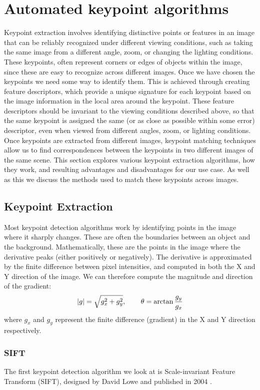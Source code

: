 \section{Automated keypoint algorithms}
\label{sec:keypoint-algos}
Keypoint extraction involves identifying distinctive points or features in an image that can be reliably recognized under different viewing conditions, such as taking the same image from a different angle, zoom, or changing the lighting conditions. These keypoints, often represent corners or edges of objects within the image, since these are easy to recognize across different images.
Once we have chosen the keypoints we need some way to identify them. This is achieved through creating feature descriptors, which provide a unique signature for each keypoint based on the image information in the local area around the keypoint. These feature descriptors should be invariant to the viewing conditions described above, so that the same keypoint is assigned the same (or as close as possible within some error) descriptor, even when viewed from different angles, zoom, or lighting conditions.
Once keypoints are extracted from different images, keypoint matching techniques allow us to find correspondences between the keypoints in two different images of the same scene. This section explores various keypoint extraction algorithms, how they work, and resulting advantages and disadvantages for our use case. As well as this we discuss the methods used to match these keypoints across images.\\

\subsection{Keypoint Extraction}
Most keypoint detection algorithms work by identifying points in the image where it sharply changes. These are often the boundaries between an object and the background. Mathematically, these are the points in the image where the derivative peaks (either positively or negatively). The derivative is approximated by the finite difference between pixel intensities, and computed in both the X and Y direction of the image. We can therefore compute the magnitude and direction of the gradient:
$$|g| = \sqrt{g^2_x + g^2_y}, \operatorname{\operatorname{\: \: \: \:} \operatorname{\: \: \: \:}} \theta = \arctan{\frac{g_y}{g_x}}$$
where $g_x$ and $g_y$ represent the finite difference (gradient) in the X and Y direction respectively. 

\subsubsection{SIFT}
The first keypoint detection algorithm we look at is Scale-invariant Feature Transform (SIFT), designed by David Lowe and published in 2004 \cite{SIFT}.\\

